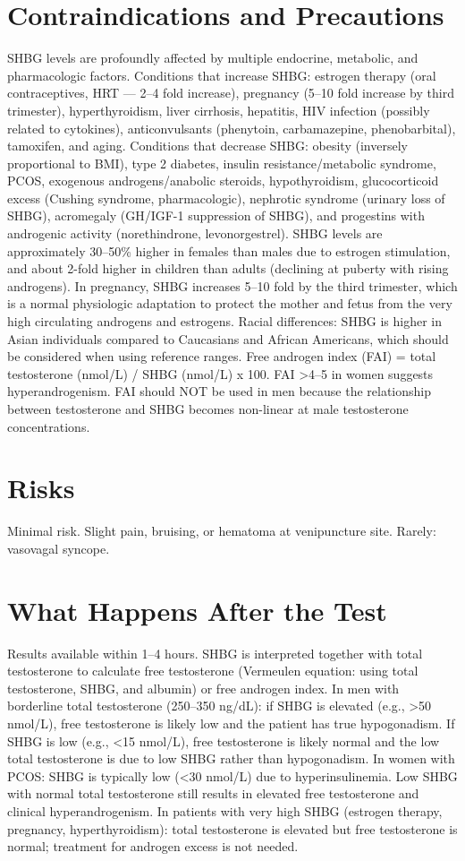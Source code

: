 \section*{Contraindications and Precautions}
SHBG levels are profoundly affected by multiple endocrine, metabolic, and pharmacologic factors. Conditions that increase SHBG: estrogen therapy (oral contraceptives, HRT --- 2--4 fold increase), pregnancy (5--10 fold increase by third trimester), hyperthyroidism, liver cirrhosis, hepatitis, HIV infection (possibly related to cytokines), anticonvulsants (phenytoin, carbamazepine, phenobarbital), tamoxifen, and aging. Conditions that decrease SHBG: obesity (inversely proportional to BMI), type 2 diabetes, insulin resistance/metabolic syndrome, PCOS, exogenous androgens/anabolic steroids, hypothyroidism, glucocorticoid excess (Cushing syndrome, pharmacologic), nephrotic syndrome (urinary loss of SHBG), acromegaly (GH/IGF-1 suppression of SHBG), and progestins with androgenic activity (norethindrone, levonorgestrel). SHBG levels are approximately 30--50\% higher in females than males due to estrogen stimulation, and about 2-fold higher in children than adults (declining at puberty with rising androgens). In pregnancy, SHBG increases 5--10 fold by the third trimester, which is a normal physiologic adaptation to protect the mother and fetus from the very high circulating androgens and estrogens. Racial differences: SHBG is higher in Asian individuals compared to Caucasians and African Americans, which should be considered when using reference ranges. Free androgen index (FAI) = total testosterone (nmol/L) / SHBG (nmol/L) x 100. FAI >4--5 in women suggests hyperandrogenism. FAI should NOT be used in men because the relationship between testosterone and SHBG becomes non-linear at male testosterone concentrations.

\section*{Risks}
Minimal risk. Slight pain, bruising, or hematoma at venipuncture site. Rarely: vasovagal syncope.

\section*{What Happens After the Test}
Results available within 1--4 hours. SHBG is interpreted together with total testosterone to calculate free testosterone (Vermeulen equation: using total testosterone, SHBG, and albumin) or free androgen index. In men with borderline total testosterone (250--350 ng/dL): if SHBG is elevated (e.g., >50 nmol/L), free testosterone is likely low and the patient has true hypogonadism. If SHBG is low (e.g., <15 nmol/L), free testosterone is likely normal and the low total testosterone is due to low SHBG rather than hypogonadism. In women with PCOS: SHBG is typically low (<30 nmol/L) due to hyperinsulinemia. Low SHBG with normal total testosterone still results in elevated free testosterone and clinical hyperandrogenism. In patients with very high SHBG (estrogen therapy, pregnancy, hyperthyroidism): total testosterone is elevated but free testosterone is normal; treatment for androgen excess is not needed.

